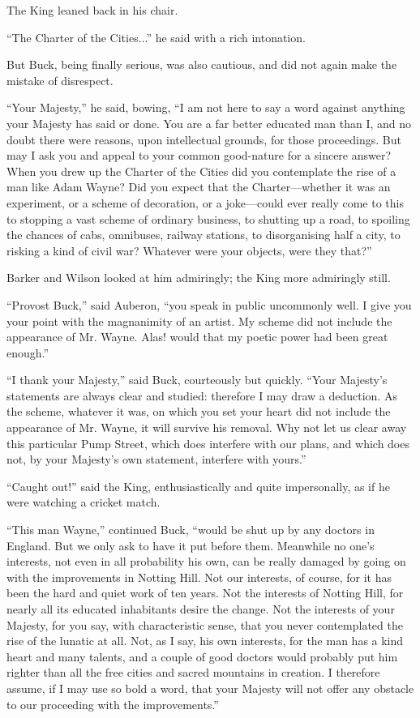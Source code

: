 \documentclass{book}
\begin{document}
The King leaned back in his chair.

“The Charter of the Cities...” he said with a rich intonation.

But Buck, being finally serious, was also cautious, and did not again make the mistake of disrespect.

“Your Majesty,” he said, bowing, “I am not here to say a word against anything your Majesty has said or done. You are a far better educated man than I, and no doubt there were reasons, upon intellectual grounds, for those proceedings. But may I ask you and appeal to your common good-nature for a sincere answer? When you drew up the Charter of the Cities did you contemplate the rise of a man like Adam Wayne? Did you expect that the Charter—whether it was an experiment, or a scheme of decoration, or a joke—could ever really come to this to stopping a vast scheme of ordinary business, to shutting up a road, to spoiling the chances of cabs, omnibuses, railway stations, to disorganising half a city, to risking a kind of civil war? Whatever were your objects, were they that?”

Barker and Wilson looked at him admiringly; the King more admiringly still.

“Provost Buck,” said Auberon, “you speak in public uncommonly well. I give you your point with the magnanimity of an artist. My scheme did not include the appearance of Mr. Wayne. Alas! would that my poetic power had been great enough.”

“I thank your Majesty,” said Buck, courteously but quickly. “Your Majesty’s statements are always clear and studied: therefore I may draw a deduction. As the scheme, whatever it was, on which you set your heart did not include the appearance of Mr. Wayne, it will survive his removal. Why not let us clear away this particular Pump Street, which does interfere with our plans, and which does not, by your Majesty’s own statement, interfere with yours.”

“Caught out!” said the King, enthusiastically and quite impersonally, as if he were watching a cricket match.

“This man Wayne,” continued Buck, “would be shut up by any doctors in England. But we only ask to have it put before them. Meanwhile no one’s interests, not even in all probability his own, can be really damaged by going on with the improvements in Notting Hill. Not our interests, of course, for it has been the hard and quiet work of ten years. Not the interests of Notting Hill, for nearly all its educated inhabitants desire the change. Not the interests of your Majesty, for you say, with characteristic sense, that you never contemplated the rise of the lunatic at all. Not, as I say, his own interests, for the man has a kind heart and many talents, and a couple of good doctors would probably put him righter than all the free cities and sacred mountains in creation. I therefore assume, if I may use so bold a word, that your Majesty will not offer any obstacle to our proceeding with the improvements.”
\end{document}
